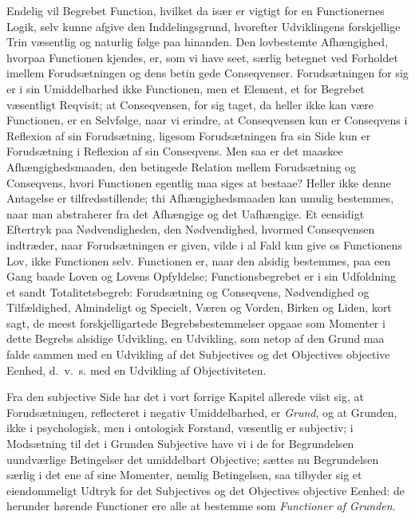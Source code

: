 \documentclass[12pt]{book}
\newcommand{\opage}[1]{\marginnote{\footnotesize\textit{[#1]}}}
\begin{document}
Endelig vil Begrebet Function, hvilket da især er vigtigt for en Functionernes Logik, selv kunne afgive
den Inddelingsgrund, hvorefter Udviklingens forskjellige Trin væsentlig og naturlig følge paa hinanden.
Den lovbestemte Afhængighed, hvorpaa Functionen kjendes, er, som vi have seet, særlig betegnet ved
Forholdet imellem Forudsætningen og dens betin%
\opage{284} gede Conseqvenser. Forudsætningen for sig er i sin Umiddelbarhed ikke Functionen, men et Element, et
for Begrebet væsentligt Reqvisit; at Conseqvensen, for sig taget, da heller ikke kan være Functionen,
er en Selvfølge, naar vi erindre, at Conseqvensen kun er Conseqvens i Reflexion af sin Forudsætning,
ligesom Forudsætningen fra sin Side kun er Forudsætning i Reflexion af sin Conseqvens. Men saa er det
maaskee Afhængighedsmaaden, den betingede Relation mellem Forudsætning og Conseqvens, hvori Functionen
egentlig maa siges at bestaae? Heller ikke denne Antagelse er tilfredsstillende; thi Afhængighedsmaaden
kan umulig bestemmes, naar man abstraherer fra det Afhængige og det Uafhængige. Et eensidigt Eftertryk
paa Nødvendigheden, den Nødvendighed, hvormed Conseqvensen indtræder, naar Forudsætningen er given,
vilde i al Fald kun give os Functionens Lov, ikke Functionen selv. Functionen er, naar den alsidig
bestemmes, paa een Gang baade Loven og Lovens Opfyldelse; Functionsbegrebet er i sin Udfoldning et sandt
Totalitetsbegreb: Forudsætning og Conseqvens, Nødvendighed og Tilfældighed, Almindeligt og Specielt,
Væren og Vorden, Birken og Liden, kort sagt, de meest forskjelligartede Begrebsbestemmelser opgaae som
Momenter i dette Begrebs alsidige Udvikling, en Udvikling, som netop af den Grund maa falde sammen med
en Udvikling af det Subjectives og det Objectives objective Eenhed, d.\ v.\ s. med en Udvikling af
Objectiviteten.

Fra den subjective Side har det i vort forrige Kapitel allerede viist sig, at Forudsætningen,
reflecteret i negativ Umiddelbarhed, er \emph{Grund}, og at Grunden, ikke i psychologisk, men i
ontologisk Forstand, væsentlig er subjectiv; i Modsætning til det i Grunden Subjective have vi i de for
Begrundelsen uundværlige Betingelser det umiddelbart Objective; sættes nu Begrundelsen særlig i det ene
af sine Momenter, nemlig Betingelsen, saa tilbyder sig et eiendommeligt Udtryk for det Subjectives og
det Objectives objective Eenhed: de
\opage{285} herunder hørende Functioner ere alle at bestemme som \emph{Functioner af Grunden}.
\end{document}
